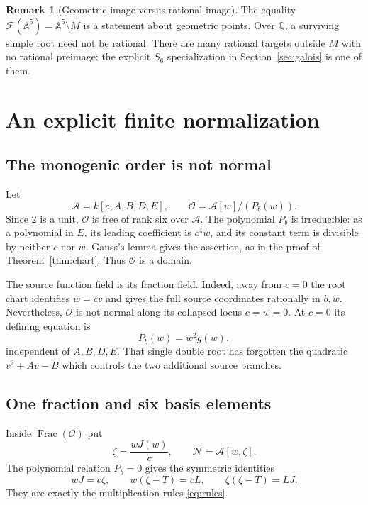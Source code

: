 \documentclass[11pt,a4paper]{article}
\theoremstyle{definition}
\newtheorem{remark}[theorem]{Remark}
\newcommand{\A}{\mathbb A}
\newcommand{\Q}{\mathbb Q}
\newcommand{\F}{\mathcal F}
\newcommand{\base}{\mathcal A}
\newcommand{\normal}{\mathcal N}
\newcommand{\ord}{\mathcal O}
\begin{document}
\begin{remark}[Geometric image versus rational image]
The equality $\F(\A^5)=\A^5\setminus M$ is a statement about geometric
points. Over $\Q$, a surviving simple root need not be rational. There are
many rational targets outside $M$ with no rational preimage; the explicit
$S_6$ specialization in Section~\ref{sec:galois} is one of them.
\end{remark}

\section{An explicit finite normalization}
\label{sec:normalization}

\subsection{The monogenic order is not normal}
Let
\[
 \base=k[c,A,B,D,E],\qquad
 \ord=\base[w]/(P_b(w)).
\]
Since $2$ is a unit, $\ord$ is free of rank six over $\base$.
The polynomial $P_b$ is irreducible: as a polynomial in $E$, its leading
coefficient is $c^4w$, and its constant term is divisible by neither $c$
nor $w$. Gauss's lemma gives the assertion, as in the proof of
Theorem~\ref{thm:chart}. Thus $\ord$ is a domain.

The source function field is its fraction field. Indeed, away from $c=0$
the root chart identifies $w=cv$ and gives the full source coordinates
rationally in $b,w$. Nevertheless, $\ord$ is not normal along its
collapsed locus $c=w=0$. At $c=0$ its defining equation is
\[
 P_b(w)=w^2g(w),
\]
independent of $A,B,D,E$. That single double root has forgotten the
quadratic $v^2+Av-B$ which controls the two additional source branches.

\subsection{One fraction and six basis elements}
Inside $\operatorname{Frac}(\ord)$ put
\begin{equation}\label{eq:zeta}
 \zeta=\frac{wJ(w)}{c},\qquad \normal=\base[w,\zeta].
\end{equation}
The polynomial relation $P_b=0$ gives the symmetric identities
\begin{equation}\label{eq:rankone}
 wJ=c\zeta,\qquad w(\zeta-T)=cL,\qquad
 \zeta(\zeta-T)=LJ.
\end{equation}
They are exactly the multiplication rules \eqref{eq:rules}.
\end{document}
